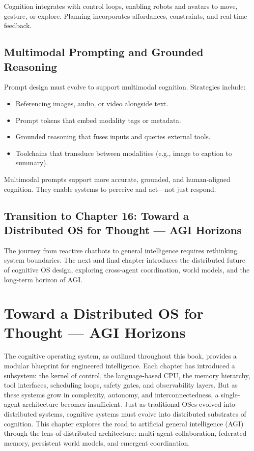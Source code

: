 \documentclass{book}
\begin{document}
Cognition integrates with control loops, enabling robots and avatars to move, gesture, or explore. Planning incorporates affordances, constraints, and real-time feedback.

\section{Multimodal Prompting and Grounded Reasoning}

Prompt design must evolve to support multimodal cognition. Strategies include:

\begin{itemize}
  \item Referencing images, audio, or video alongside text.
  \item Prompt tokens that embed modality tags or metadata.
  \item Grounded reasoning that fuses inputs and queries external tools.
  \item Toolchains that transduce between modalities (e.g., image to caption to summary).
\end{itemize}

Multimodal prompts support more accurate, grounded, and human-aligned cognition. They enable systems to perceive and act—not just respond.

\section*{Transition to Chapter 16: Toward a Distributed OS for Thought — AGI Horizons}

The journey from reactive chatbots to general intelligence requires rethinking system boundaries. The next and final chapter introduces the distributed future of cognitive OS design, exploring cross-agent coordination, world models, and the long-term horizon of AGI.

\chapter{Toward a Distributed OS for Thought — AGI Horizons}

The cognitive operating system, as outlined throughout this book, provides a modular blueprint for engineered intelligence. Each chapter has introduced a subsystem: the kernel of control, the language-based CPU, the memory hierarchy, tool interfaces, scheduling loops, safety gates, and observability layers. But as these systems grow in complexity, autonomy, and interconnectedness, a single-agent architecture becomes insufficient. Just as traditional OSes evolved into distributed systems, cognitive systems must evolve into distributed substrates of cognition. This chapter explores the road to artificial general intelligence (AGI) through the lens of distributed architecture: multi-agent collaboration, federated memory, persistent world models, and emergent coordination.
\end{document}
